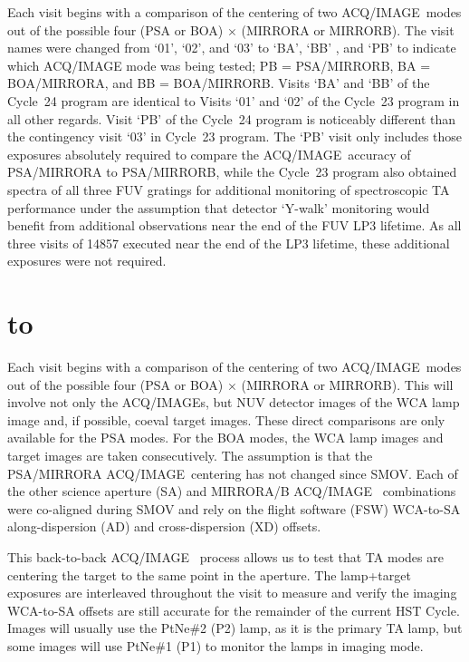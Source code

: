 \documentclass[12pt]{reportj}
\newcommand*{\myfont}{\fontfamily{rm}\selectfont}
\def\acqimage{{\myfont ACQ/IMAGE}\rm}
\def\acqimages{{\myfont ACQ/IMAGE{\rm s}}\rm}
\def\ssection#1{\addtocounter{section}{1} \setcounter{subsection}{0} \section*{\hbox to \hsize{\large\bf \arabic{section}. #1\hfill }}}
\begin{document}
Each visit begins with a comparison of the centering of two \acqimage~modes out of the possible four (PSA or BOA) $\times$ (MIRRORA or MIRRORB). The visit names were changed from `01', `02', and `03' to `BA', `BB' , and `PB' to indicate which ACQ/IMAGE mode was being tested; PB = PSA/MIRRORB, BA = BOA/MIRRORA, and BB = BOA/MIRRORB. Visits `BA' and `BB' of the Cycle~24 program are identical to Visits `01' and `02' of the Cycle~23 program in all other regards.
Visit `PB' of the Cycle~24 program is noticeably different than the contingency visit `03' in Cycle~23 program. The `PB' visit only includes those exposures absolutely required to compare the \acqimage~accuracy of PSA/MIRRORA to PSA/MIRRORB, while the Cycle~23 program also obtained spectra of all three FUV gratings for additional monitoring of spectroscopic TA performance under the assumption that detector `Y-walk' monitoring would benefit from additional observations near the end of the FUV LP3 lifetime. As all three visits of 14857 executed near the end of the LP3 lifetime, these additional exposures were not required.
\clearpage
\ssection{Program Structure \label{sec:structure}}
Each visit begins with a comparison of the centering of two \acqimage~modes out of the possible four (PSA or BOA) $\times$ (MIRRORA or MIRRORB). This will involve not only the \acqimages, but NUV detector images of the WCA lamp image and, if possible, coeval target images. These direct comparisons are only available for the PSA modes. For the BOA modes, the WCA lamp images and target images are taken consecutively. The assumption is that the PSA/MIRRORA \acqimage~centering has not changed since SMOV. Each of the other science aperture (SA) and MIRRORA/B \acqimage~ combinations were co-aligned during SMOV and rely on the flight software
(FSW) WCA-to-SA along-dispersion (AD) and cross-dispersion (XD) offsets.

This back-to-back \acqimage~ process allows us to test that TA modes are centering the target to the same point in the aperture. The lamp+target exposures are interleaved throughout the visit to measure and verify the imaging WCA-to-SA offsets are still accurate for the remainder of the current HST Cycle. Images will usually use the PtNe\#2 (P2) lamp, as it is the primary TA lamp, but some images will use PtNe\#1 (P1) to monitor the lamps in imaging mode.
\end{document}
